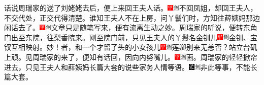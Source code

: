 话说周瑞家的送了刘姥姥去后，便上来回王夫人话。{\includegraphics[width=3mm]{../Images/00002}\includegraphics[width=3mm]{../Images/00011}\footnotesize \kaishu 不回凤姐，却回王夫人，不交代处，正交代得清楚。}谁知王夫人不在上房，问丫鬟们时，方知往薛姨妈那边闲话去了。{\includegraphics[width=3mm]{../Images/00002}\includegraphics[width=3mm]{../Images/00011}\footnotesize \kaishu 文章只是随笔写来，便有流离生动之妙。}周瑞家的听说，便转东角门出至东院，往梨香院来。刚至院门前，只见王夫人的丫鬟名金钏儿{\includegraphics[width=3mm]{../Images/00002}\includegraphics[width=3mm]{../Images/00011}\footnotesize \kaishu 金钏、宝钗互相映射。妙！}者，和一个才留了头的小女孩儿{\includegraphics[width=3mm]{../Images/00002}\includegraphics[width=3mm]{../Images/00011}\footnotesize \kaishu 莲卿别来无恙否？}站立台矶上顽。见周瑞家的来了，便知有话回，因向内努嘴儿。{\includegraphics[width=3mm]{../Images/00002}\includegraphics[width=3mm]{../Images/00011}\footnotesize \kaishu 画。}周瑞家的轻轻掀帘进去，只见王夫人和薛姨妈长篇大套的说些家务人情等语。{\includegraphics[width=3mm]{../Images/00006}\includegraphics[width=3mm]{../Images/00011}\footnotesize \kaishu 非此等事，不能长篇大套。}

